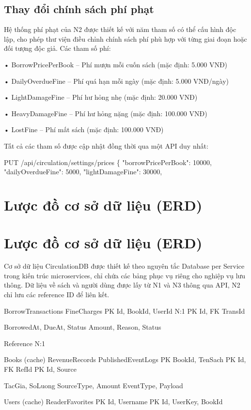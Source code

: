 \subsection{Thay đổi chính sách phí phạt}

Hệ thống phí phạt của N2 được thiết kế với năm tham số có thể cấu hình độc lập, cho phép thư viện điều chỉnh chính sách phí phù hợp với từng giai đoạn hoặc đối tượng độc giả. Các tham số phí:

• BorrowPricePerBook – Phí mượn mỗi cuốn sách (mặc định: 5.000 VNĐ)

• DailyOverdueFine – Phí quá hạn mỗi ngày (mặc định: 5.000 VNĐ/ngày)

• LightDamageFine – Phí hư hỏng nhẹ (mặc định: 20.000 VNĐ)

• HeavyDamageFine – Phí hư hỏng nặng (mặc định: 100.000 VNĐ)

• LostFine – Phí mất sách (mặc định: 100.000 VNĐ)

Tất cả các tham số được cập nhật đồng thời qua một API duy nhất:

PUT /api/circulation/settings/prices \{ "borrowPricePerBook": 10000, "dailyOverdueFine": 5000, "lightDamageFine": 30000,

\section{Lược đồ cơ sở dữ liệu (ERD)}

\section{Lược đồ cơ sở dữ liệu (ERD)}

Cơ sở dữ liệu CirculationDB được thiết kế theo nguyên tắc Database per Service trong kiến trúc microservices, chỉ chứa các bảng phục vụ riêng cho nghiệp vụ lưu thông. Dữ liệu về sách và người dùng được lấy từ N1 và N3 thông qua API, N2 chỉ lưu các reference ID để liên kết.

BorrowTransactions FineCharges PK Id, BookId, UserId N:1 PK Id, FK TransId

BorrowedAt, DueAt, Status Amount, Reason, Status

Reference N:1

Books (cache) RevenueRecords PublishedEventLogs PK BookId, TenSach PK Id, FK RefId PK Id, Source

TacGia, SoLuong SourceType, Amount EventType, Payload

Users (cache) ReaderFavorites PK Id, Username PK Id, UserKey, BookId

